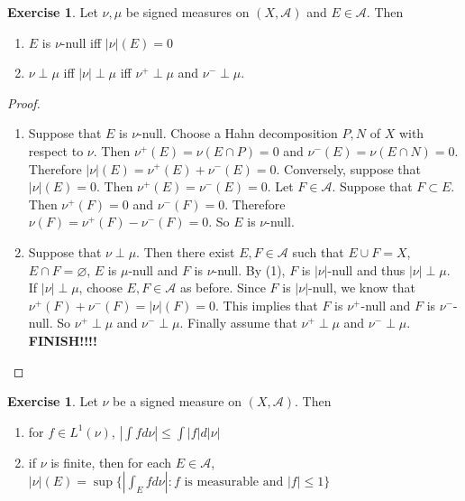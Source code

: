 \documentclass[12pt]{amsart}
\theoremstyle{definition}
\newtheorem{ex}[definition]{Exercise}
\newcommand{\MA}{\mathcal{A}}
\begin{document}
	\begin{ex}
		Let $\nu, \mu$ be signed measures on $(X,\MA)$ and $E \in \MA$. Then 
		\begin{enumerate}
			\item $E$ is $\nu$-null iff $|\nu|(E) = 0$
			\item $\nu \perp \mu$ iff $|\nu| \perp \mu$ iff $\nu^+ \perp \mu$ and $\nu^- \perp \mu$.
		\end{enumerate}
	\end{ex}
	
	\begin{proof}
		\begin{enumerate}
			\item Suppose that $E$ is $\nu$-null. Choose a Hahn decomposition $P,N$ of $X$ with respect to $\nu$. Then $\nu^+(E) = \nu(E \cap P) = 0$ and $\nu^-(E) = \nu(E \cap N) = 0$. Therefore $|\nu|(E) = \nu^+(E) + \nu^-(E) = 0$. Conversely, suppose that $|\nu|(E) = 0$. Then $\nu^+(E) = \nu^-(E) = 0$. Let $F \in \MA$. Suppose that $F \subset E$. Then $\nu^+(F) = 0$ and $\nu^-(F) = 0$. Therefore $\nu(F) = \nu^+(F) - \nu^-(F) = 0$. So $E$ is $\nu$-null.
			
			\item Suppose that $\nu \perp \mu$. Then there exist $E,F \in \MA$ such that $E \cup F = X$, $E \cap F = \varnothing$, $E$ is $\mu$-null and $F$ is $\nu$-null. By (1), $F$ is $|\nu|$-null and thus $|\nu| \perp \mu$. If $|\nu| \perp \mu$, choose $E,F \in \MA$ as before. Since $F$ is $|\nu|$-null, we know that $\nu^+(F) + \nu^-(F) = |\nu|(F) = 0$. This implies that $F$ is $\nu^+$-null and $F$ is $\nu^-$-null. So $\nu^+ \perp \mu$ and $\nu^- \perp \mu$. Finally assume that $\nu^+ \perp \mu$ and $\nu^- \perp \mu$. \textbf{FINISH!!!!}
			
		\end{enumerate}
	\end{proof}
	
	\begin{ex}
		Let $\nu$ be a signed measure on $(X, \MA)$. Then 
		\begin{enumerate}
			\item for $f \in L^1(\nu)$, $|\int f d \nu| \leq \int |f| d |\nu|$
			\item if $\nu$ is finite, then for each $E \in \MA$, $|\nu|(E) = \sup \{|\int_E f d \nu |: f  \text{ is measurable and } |f| \leq 1 \}$
		\end{enumerate}
	\end{ex}
	
\end{document}
